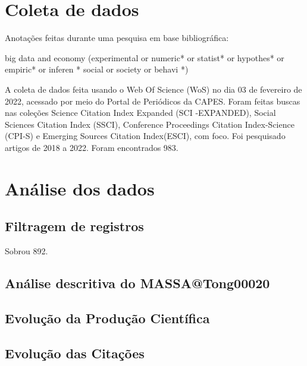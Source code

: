 \section{Coleta de dados}

Anotações feitas durante uma pesquisa em base bibliográfica:

big data and economy (experimental  or  numeric* or  statist* or  hypothes* or  empiric* or  inferen * social  or  society  or  behavi *)

A coleta de dados feita usando o Web Of Science (WoS) no dia 03 de fevereiro de 2022, acessado por meio do Portal de Periódicos da CAPES. Foram feitas buscas nas coleções Science  Citation  Index  Expanded (SCI -EXPANDED), Social Sciences  Citation  Index (SSCI), Conference Proceedings Citation Index-Science (CPI-S) e Emerging Sources Citation Index(ESCI), com foco.
Foi pesquisado artigos de 2018 a 2022.
Foram encontrados 983.

\section{Análise dos dados}

\subsection{Filtragem de registros}

Sobrou 892.

\subsection{Análise descritiva do %
MASSA@Tong00020}



\subsection{Evolução da Produção Científica}




\subsection{Evolução das Citações}
